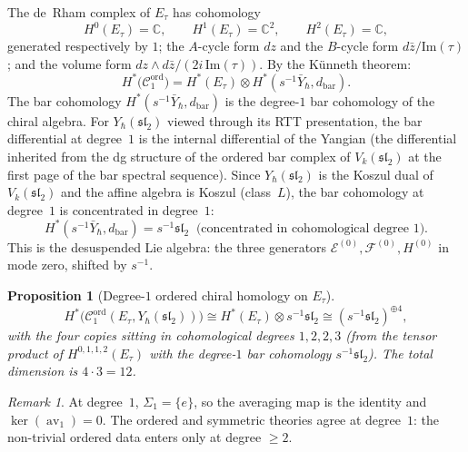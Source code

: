 \documentclass[11pt,reqno]{amsart}
\newtheorem{proposition}[theorem]{Proposition}
\theoremstyle{definition}
\theoremstyle{remark}
\newtheorem{remark}[theorem]{Remark}
\newcommand{\cC}{\mathcal{C}}
\DeclareMathOperator{\av}{av}
\newcommand{\CC}{\mathbb{C}}
\numberwithin{equation}{section}
\begin{document}
The de~Rham complex of $E_\tau$ has cohomology
\begin{equation}\label{eq:dr-etau}
  H^0(E_\tau) = \CC, \qquad
  H^1(E_\tau) = \CC^2, \qquad
  H^2(E_\tau) = \CC,
\end{equation}
generated respectively by $1$; the $A$-cycle form
$dz$ and the $B$-cycle form
$d\bar{z}/\mathrm{Im}(\tau)$; and the volume form
$dz \wedge d\bar{z}/(2i\,\mathrm{Im}(\tau))$.
By the K\"unneth theorem:
\begin{equation}\label{eq:ell-degree1-kunneth}
  H^*\bigl(\cC_1^{\mathrm{ord}}\bigr)
  = H^*(E_\tau) \otimes H^*(s^{-1}\bar{Y}_\hbar,
  d_{\mathrm{bar}}).
\end{equation}
The bar cohomology $H^*(s^{-1}\bar{Y}_\hbar, d_{\mathrm{bar}})$
is the degree-$1$ bar cohomology of the chiral algebra.
For $Y_\hbar(\mathfrak{sl}_2)$ viewed through its
RTT presentation, the bar differential at degree~$1$ is
the internal differential of the Yangian (the differential
inherited from the dg structure of the ordered bar
complex of $V_k(\mathfrak{sl}_2)$ at the first page of
the bar spectral sequence). Since $Y_\hbar(\mathfrak{sl}_2)$
is the Koszul dual of $V_k(\mathfrak{sl}_2)$ and the
affine algebra is Koszul (class~$L$), the bar cohomology
at degree~$1$ is concentrated in degree~$1$:
\begin{equation}\label{eq:bar-degree1-yangian}
  H^*(s^{-1}\bar{Y}_\hbar, d_{\mathrm{bar}})
  = s^{-1}\mathfrak{sl}_2
  \;\;\text{(concentrated in cohomological degree $1$).}
\end{equation}
This is the desuspended Lie algebra: the three generators
$\mathcal{E}^{(0)}, \mathcal{F}^{(0)}, H^{(0)}$ in mode
zero, shifted by $s^{-1}$.

\begin{proposition}[Degree-$1$ ordered chiral homology on
$E_\tau$]
\label{prop:ell-degree1}
\begin{equation}\label{eq:ell-degree1-result}
  H^*\bigl(\cC_1^{\mathrm{ord}}(E_\tau,
  Y_\hbar(\mathfrak{sl}_2))\bigr)
  \cong H^*(E_\tau) \otimes s^{-1}\mathfrak{sl}_2
  \cong (s^{-1}\mathfrak{sl}_2)^{\oplus 4},
\end{equation}
with the four copies sitting in cohomological degrees
$1, 2, 2, 3$ \textup{(}from the tensor product of
$H^{0,1,1,2}(E_\tau)$ with the degree-$1$ bar cohomology
$s^{-1}\mathfrak{sl}_2$\textup{)}. The total dimension is
$4 \cdot 3 = 12$.
\end{proposition}

\begin{remark}
At degree~$1$, $\Sigma_1 = \{e\}$, so the averaging map
is the identity and $\ker(\av_1) = 0$. The ordered and
symmetric theories agree at degree~$1$: the non-trivial
ordered data enters only at degree $\geq 2$.
\end{remark}
\end{document}
